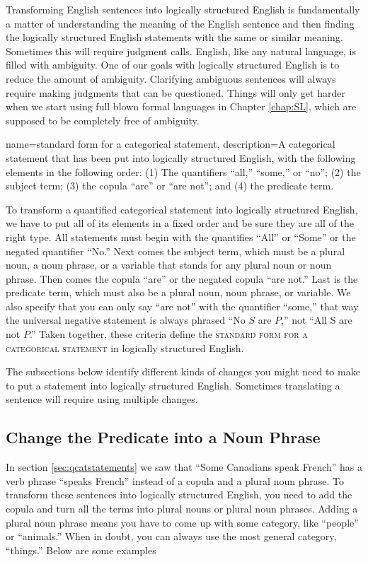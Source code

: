 Transforming English sentences into logically structured English is fundamentally a matter of understanding the meaning of the English sentence and then finding the logically structured English statements with the same or similar meaning. Sometimes this will require judgment calls. English, like any natural  language, is filled  with ambiguity. One of our goals with logically structured English is to reduce the amount of ambiguity. Clarifying ambiguous sentences will always require making judgments that can be questioned. Things will only get harder when we start using full blown formal languages in Chapter \ref{chap:SL}, which are supposed to be completely free of ambiguity.

{
name=standard form for a categorical statement,
description={A categorical statement that has been put into logically structured English, with the following elements in the following order: (1) The quantifiers ``all,'' ``some,'' or ``no''; (2) the subject term; (3) the copula ``are'' or ``are not''; and (4) the predicate term.}
}


To transform a quantified categorical statement into logically structured English, we have to put all of its elements in a fixed order and be sure they are all of the right type. All statements must begin with the quantifies ``All'' or ``Some'' or the negated quantifier ``No.'' Next comes the subject term, which must be a plural noun, a noun phrase, or a variable that stands for any plural noun or noun phrase. Then comes the copula ``are'' or the negated copula ``are not.'' Last is the predicate term, which must also be a plural noun, noun phrase, or variable. We also specify that you can only say ``are not'' with the quantifier ``some,'' that way the universal negative statement is always phrased ``No $S$ are $P$,'' not ``All S are not $P$.'' Taken together, these criteria define the \textsc{\gls{standard form for a categorical statement}} in logically structured English. \label{def:standard_form_cat_statement}

The subsections below identify different kinds of changes you might need to make to put a statement into logically structured English. Sometimes translating a sentence will require using multiple changes.

\subsection{Change the Predicate into a Noun Phrase}
\label{subsec:predicate_noun_phrase}
In section \ref{sec:qcatstatements} we saw that ``Some Canadians speak French'' has a verb phrase ``speaks French'' instead of a copula and a plural noun phrase. To transform these sentences into logically structured English, you need to add the copula and turn all the terms into plural nouns or plural noun phrases. Adding a plural noun phrase means you have to come up with some category, like ``people'' or ``animals.'' When in doubt, you can always use the most general category, ``things.'' Below are some examples

